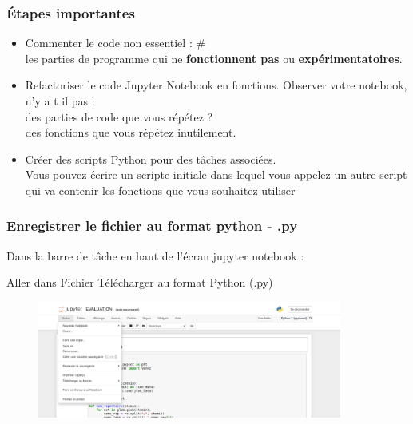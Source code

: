 \begin{frame}
 \frametitle{Étapes importantes}
\begin{itemize}
\item Commenter le code non essentiel : \# \\
 les parties de programme qui ne \textbf{fonctionnent pas} ou \textbf{expérimentatoires}.

\pause

\item Refactoriser le code Jupyter Notebook en fonctions. Observer votre notebook, n'y a t il pas :\\
 des parties de code que vous répétez ?\\
 des fonctions que vous répétez inutilement.

\pause

\item Créer des scripts Python pour des tâches associées.\\
 Vous pouvez écrire un scripte initiale dans lequel vous appelez un autre script qui va contenir les fonctions que vous souhaitez utiliser
\end{itemize} 
\end{frame}


\begin{frame}
  \frametitle{Enregistrer le fichier au format python - .py}
  Dans la barre de tâche en haut de l'écran jupyter notebook :
  
  
  Aller dans Fichier   Télécharger au format   Python (.py)
  
  \begin{figure}
  \includegraphics[width=10cm]{images/ynpb_convert_py.png}
  \end{figure}
 
\end{frame}



%  




